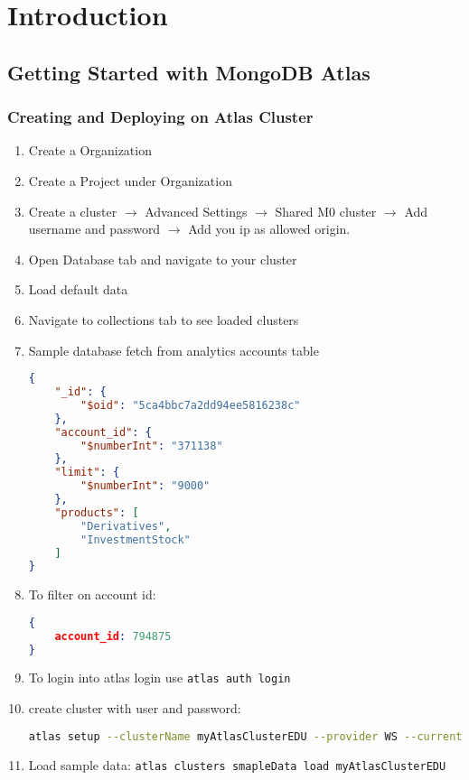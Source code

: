 \documentclass[../main.tex]{subfiles}
\begin{document}
\chapter{Introduction}
\section{Getting Started with MongoDB Atlas}
\subsection{Creating and Deploying on Atlas Cluster}
\begin{enumerate}
	\item{Create a Organization}
	\item{Create a Project under Organization}
	\item{Create a cluster $\rightarrow$ Advanced Settings $\rightarrow$ Shared M0 cluster $\rightarrow$ Add username and password $\rightarrow$ Add you ip as allowed origin.}
	\item{Open Database tab and navigate to your cluster}
	\item{Load default data}
	\item{Navigate to collections tab to see loaded clusters}
	\item{Sample database fetch from analytics accounts table
		\begin{lstlisting}[caption=account test data,language=json]
{
	"_id": {
		"$oid": "5ca4bbc7a2dd94ee5816238c"
	},
	"account_id": {
		"$numberInt": "371138"
	},
	"limit": {
		"$numberInt": "9000"
	},
	"products": [
		"Derivatives",
		"InvestmentStock"
	]
}
		\end{lstlisting}
	}
\item{To filter on account id:
		\begin{lstlisting}[caption=filter on account id,language=json]
{
	account_id: 794875
}
	\end{lstlisting}
}
\item{To login into atlas login use \lstinline[language=bash,caption=atlas authentication]{atlas auth login}}
\item{create cluster with user and password:
		\begin{lstlisting}[caption=load cluster,language=bash]
atlas setup --clusterName myAtlasClusterEDU --provider WS --currentIp --skipSampleData --username myAtlasDBUser --password myatlas-001 --projectId 66d19c1f26ef8b512df3b41 | tee atlas_cluster_details.txt
		\end{lstlisting}
	}
\item{Load sample data: \lstinline[caption=load sample data, language=bash]{atlas clusters smapleData load myAtlasClusterEDU} }

\end{enumerate}
\end{document}
